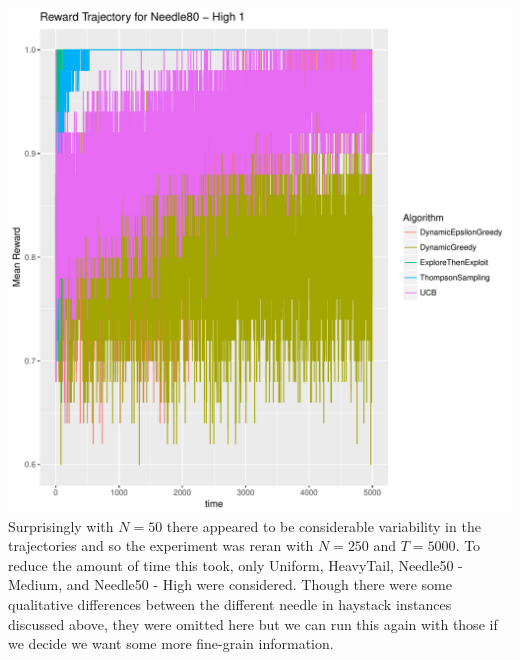\documentclass[11pt,letterpaper]{article}
\begin{document}
\includegraphics[scale=0.5]{"../results/Reward Trajectory for Needle80 - High 1"}
\\

Surprisingly with $N=50$ there appeared to be considerable variability in the trajectories and so the experiment was reran with $N=250$ and $T=5000$. To reduce the amount of time this took, only Uniform, HeavyTail, Needle50 - Medium, and Needle50 - High were considered. Though there were some qualitative differences between the different needle in haystack instances discussed above, they were omitted here but we can run this again with those if we decide we want some more fine-grain information.
\end{document}
